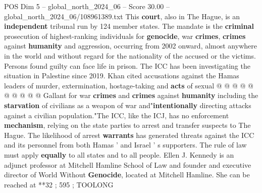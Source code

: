 \begin{textsample}{POS Dim 5 – global\_north\_2024\_06 – Score 30.00 – global\_north\_2024\_06/108961389.txt}
This \textbf{court}, also in The Hague, is an \textbf{independent} tribunal run by 124 member states.
The mandate is the \textbf{criminal} prosecution of highest-ranking individuals for \textbf{genocide}, war \textbf{crimes}, \textbf{crimes} against \textbf{humanity} and aggression, occurring from 2002 onward, almost anywhere in the world and without regard for the nationality of the accused or the victims.
Persons found guilty can face life in prison.
The ICC has been investigating the situation in Palestine since 2019.
Khan cited accusations against the Hamas leaders of murder, extermination, hostage-taking and \textbf{acts} of sexual @ @ @ @ @ @ @ @ @ @ Gallant for war \textbf{crimes} and \textbf{crimes} against \textbf{humanity} including the \textbf{starvation} of civilians as a weapon of war and"\textbf{intentionally} directing attacks against a civilian population."The ICC, like the ICJ, has no enforcement \textbf{mechanism}, relying on the state parties to arrest and transfer suspects to The Hague.
The likelihood of arrest \textbf{warrants} has generated threats against the ICC and its personnel from both Hamas ' and Israel ' s supporters.
The rule of law must apply \textbf{equally} to all states and to all people.
Ellen J.
Kennedy is an adjunct professor at Mitchell Hamline School of Law and founder and executive director of World Without \textbf{Genocide}, located at Mitchell Hamline.
She can be reached at **32 ; 595 ; TOOLONG

\end{textsample}
